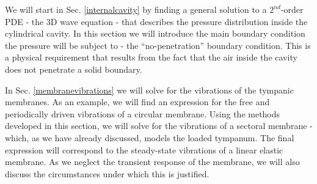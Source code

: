 We will start in Sec. \ref{internalcavity} by finding a general solution to a $2^{nd}$-order PDE - the $3$D wave
equation - that describes the pressure distribution inside the cylindrical cavity. In this section we will introduce the
main boundary condition the pressure will be subject to - the ``no-penetration'' boundary condition. This is a physical requirement that results from the fact that the air
inside the cavity does not penetrate a solid boundary.

In Sec. \ref{membranevibrations} we will solve for the vibrations of the tympanic membranes. As an example, we
will find an expression for the free and periodically driven vibrations of a circular membrane. Using the methods
developed in this section, we will solve for the vibrations of a sectoral membrane - which, as we have already discussed,
models the loaded tympanum. The final expression will correspond to the steady-state vibrations of a linear elastic
membrane. As we neglect the transient response of the membrane, we will also discuss the circumstances under which this
is justified.

